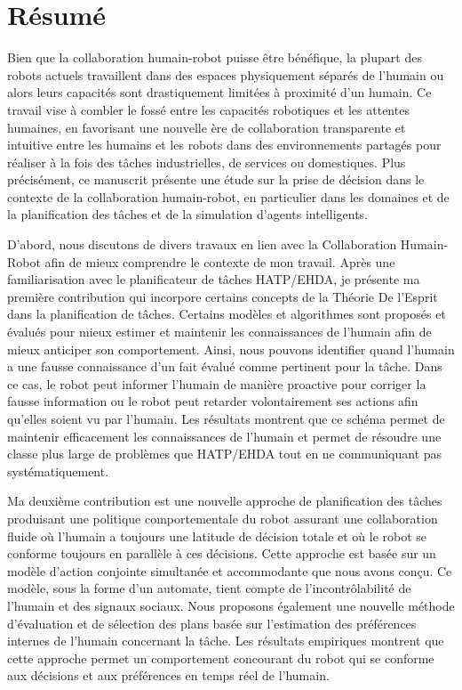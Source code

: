 \chapter*{Résumé}


Bien que la collaboration humain-robot puisse être bénéfique, la plupart des robots actuels travaillent dans des espaces physiquement séparés de l'humain ou alors leurs capacités sont drastiquement limitées à proximité d'un humain. Ce travail vise à combler le fossé entre les capacités robotiques et les attentes humaines, en favorisant une nouvelle ère de collaboration transparente et intuitive entre les humains et les robots dans des environnements partagés pour réaliser à la fois des tâches industrielles, de services ou domestiques. Plus précisément, ce manuscrit présente une étude sur la prise de décision dans le contexte de la collaboration humain-robot, en particulier dans les domaines et de la planification des tâches et de la simulation d'agents intelligents.

D'abord, nous discutons de divers travaux en lien avec la Collaboration Humain-Robot afin de mieux comprendre le contexte de mon travail. Après une familiarisation avec le planificateur de tâches HATP/EHDA, je présente ma première contribution qui incorpore certains concepts de la Théorie De l'Esprit dans la planification de tâches. Certains modèles et algorithmes sont proposés et évalués pour mieux estimer et maintenir les connaissances de l'humain afin de mieux anticiper son comportement. Ainsi, nous pouvons identifier quand l'humain a une fausse connaissance d'un fait évalué comme pertinent pour la tâche. Dans ce cas, le robot peut informer l'humain de manière proactive pour corriger la fausse information ou le robot peut retarder volontairement ses actions afin qu'elles soient vu par l'humain. Les résultats montrent que ce schéma permet de maintenir efficacement les connaissances de l'humain et permet de résoudre une classe plus large de problèmes que HATP/EHDA tout en ne communiquant pas systématiquement.

Ma deuxième contribution est une nouvelle approche de planification des tâches produisant une politique comportementale du robot assurant une collaboration fluide où l'humain a toujours une latitude de décision totale et où le robot se conforme toujours en parallèle à ces décisions. Cette approche est basée sur un modèle d'action conjointe simultanée et accommodante que nous avons conçu. Ce modèle, sous la forme d'un automate, tient compte de l'incontrôlabilité de l'humain et des signaux sociaux. Nous proposons également une nouvelle méthode d'évaluation et de sélection des plans basée sur l'estimation des préférences internes de l'humain concernant la tâche. Les résultats empiriques montrent que cette approche permet un comportement concourant du robot qui se conforme aux décisions et aux préférences en temps réel de l'humain.

